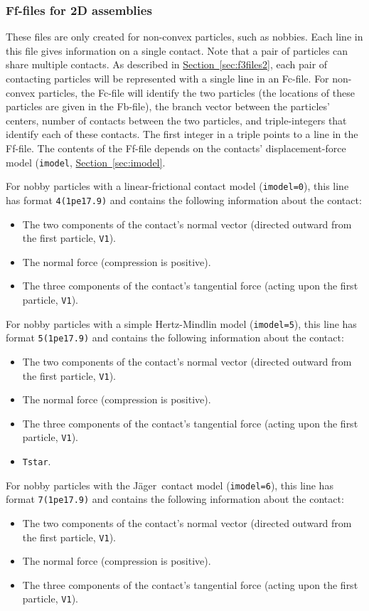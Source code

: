 \documentclass[letterpaper,11pt]{article}
\begin{document}
\subsubsection{Ff-files for 2D assemblies}\label{sec:f6files2d}
These files are only created for non-convex particles, such
as nobbies.
Each line in this file gives information on a single contact.
Note that a pair of particles can share multiple contacts.
As described in 
\hyperref[sec:f3files2]{Section~\ref*{sec:f3files2}},
each pair of contacting particles will be represented with a 
single line in an Fc-file.
For non-convex particles, the Fc-file will identify the two particles
(the locations of these particles are given in the Fb-file), 
the branch vector between the particles' centers, 
number of contacts between the two particles,
and triple-integers that identify each of these contacts.
The first integer in a triple points to a line in the Ff-file.
The contents of the Ff-file depends on the contacts'
displacement-force model (\texttt{imodel},
\hyperref[sec:imodel]{Section~\ref*{sec:imodel}}.
%
\par
For nobby particles with a linear-frictional contact
model (\texttt{imodel=0}), 
this line has format \texttt{4(1pe17.9)}
and contains the following information about the contact:
\begin{itemize}
\item
The two components of the contact's normal vector (directed outward
from the first particle, \texttt{V1}).
\item
The normal force (compression is positive).
\item
The three components of the contact's tangential force
(acting upon the first particle, \texttt{V1}).
\end{itemize}
%
\par
For nobby particles with a simple Hertz-Mindlin
model (\texttt{imodel=5}), 
this line has format \texttt{5(1pe17.9)}
and contains the following information about the contact:
\begin{itemize}
\item
The two components of the contact's normal vector (directed outward
from the first particle, \texttt{V1}).
\item
The normal force (compression is positive).
\item
The three components of the contact's tangential force
(acting upon the first particle, \texttt{V1}).
\item
\texttt{Tstar}.
\end{itemize}
%
\par
For nobby particles with the J\"{a}ger\ contact
model (\texttt{imodel=6}), 
this line has format \texttt{7(1pe17.9)}
and contains the following information about the contact:
\begin{itemize}
\item
The two components of the contact's normal vector (directed outward
from the first particle, \texttt{V1}).
\item
The normal force (compression is positive).
\item
The three components of the contact's tangential force
(acting upon the first particle, \texttt{V1}).
\end{itemize}
%
\end{document}
